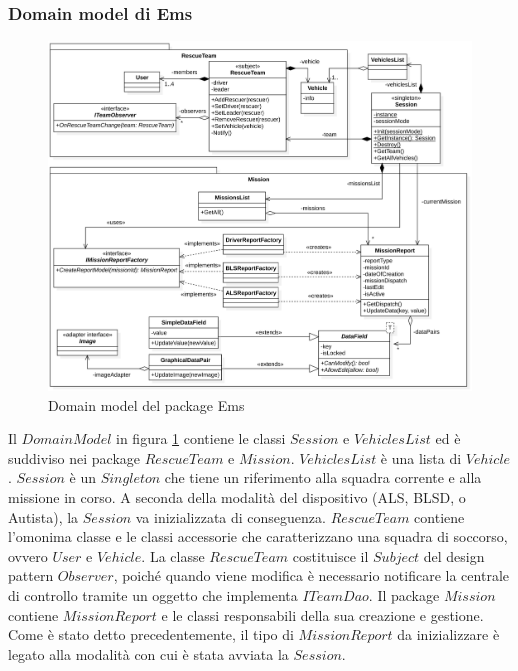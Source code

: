 \documentclass{article}
\begin{document}
    \subsubsection{Domain model di Ems}
    \begin{figure}[!h]
        \centering
        \includegraphics[width=5.4in]{diagrams/png/uml-ems-domain.png}
        \caption{Domain model del package Ems}
        \label{fig:uml-ems-domainmodel}
    \end{figure}
    Il $DomainModel$ in figura \ref{fig:uml-ems-domainmodel} contiene le classi $Session$ e $VehiclesList$ ed è suddiviso nei package $RescueTeam$ e $Mission$.
    $VehiclesList$ è una lista di $Vehicle$. $Session$ è un $Singleton$ che tiene un riferimento alla squadra corrente e alla missione in corso.
    A seconda della modalità del dispositivo (ALS, BLSD, o Autista), la $Session$ va inizializzata di conseguenza.
    $RescueTeam$ contiene l'omonima classe e le classi accessorie che caratterizzano una squadra di soccorso, ovvero $User$ e $Vehicle$.
    La classe $RescueTeam$ costituisce il $Subject$ del design pattern $Observer$, poiché quando viene modifica è necessario notificare la centrale di controllo tramite un oggetto che implementa $ITeamDao$.
    \newline Il package $Mission$ contiene $MissionReport$ e le classi responsabili della sua creazione e gestione.
    \newline Come è stato detto precedentemente, il tipo di $MissionReport$ da inizializzare è legato alla modalità con cui è stata avviata la $Session$.
\end{document}
